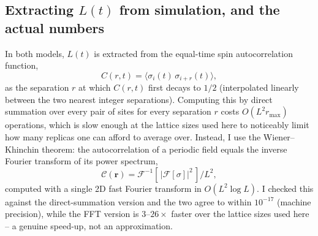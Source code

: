 \documentclass[11pt]{article}
\begin{document}
\subsection{Extracting $L(t)$ from simulation, and the actual numbers}

In both models, $L(t)$ is extracted from the equal-time spin
autocorrelation function,
\begin{equation}
C(r,t) = \langle \sigma_i(t)\,\sigma_{i+r}(t)\rangle,
\label{eq:autocorr}
\end{equation}
as the separation $r$ at which $C(r,t)$ first decays to $1/2$
(interpolated linearly between the two nearest integer separations).
Computing this by direct summation over every pair of sites for every
separation $r$ costs $O(L^2 r_{\max})$ operations, which is slow enough at
the lattice sizes used here to noticeably limit how many replicas one can
afford to average over. Instead, I use the Wiener--Khinchin theorem:
the autocorrelation of a periodic field equals the inverse Fourier
transform of its power spectrum,
\begin{equation}
\mathcal{C}(\mathbf{r}) = \mathcal{F}^{-1}\!\left[\,\left|\mathcal{F}[\sigma]\right|^2\,\right] \Big/ L^2,
\label{eq:wiener-khinchin}
\end{equation}
computed with a single 2D fast Fourier transform in $O(L^2\log L)$. I
checked this against the direct-summation version and the two agree to
within $10^{-17}$ (machine precision), while the FFT version is $3$--$26\times$
faster over the lattice sizes used here -- a genuine speed-up, not an
approximation.
\end{document}
